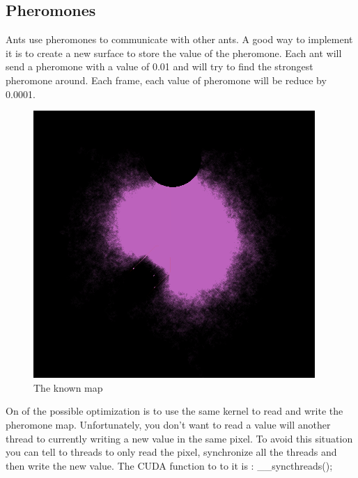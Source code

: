 \documentclass{article}
\begin{document}
\subsection{Pheromones}
Ants use pheromones to communicate with other ants. A good way to implement it is to create a new surface to store the value of the pheromone. Each ant will send a pheromone with a value of 0.01 and will try to find the strongest pheromone around. Each frame, each value of pheromone will be reduce by 0.0001.
\begin{figure}[H]
	\centering
	\includegraphics[scale=0.9]{figures/know.png}
	\caption{The known map}
\end{figure}
On of the possible optimization is to use the same kernel to read and write the pheromone map. Unfortunately, you don't want to read a value will another thread to currently writing a new value in the same pixel. To avoid this situation you can tell to threads to only read the pixel, synchronize all the threads and then write the new value. The CUDA function to to it is : \_\_syncthreads();
\end{document}
